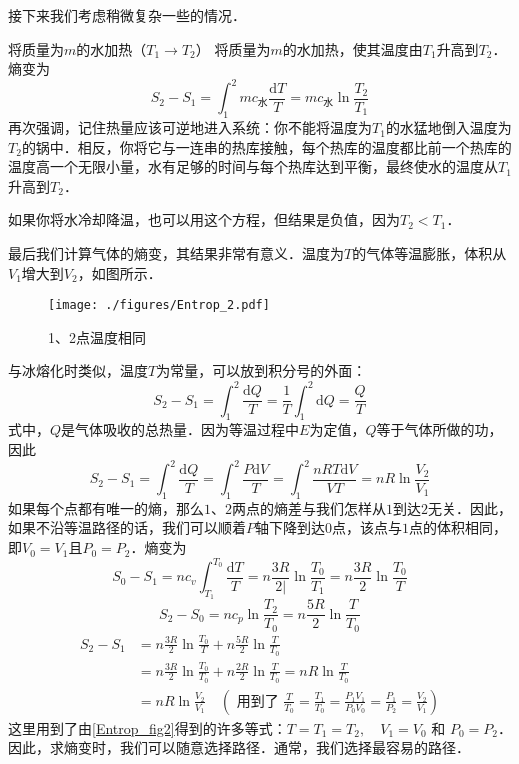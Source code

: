 接下来我们考虑稍微复杂一些的情况．

\begin{example}{将质量为$m $的水加热（$T_1\to T_2$）}
将质量为$m$的水加热，使其温度由$T_1$升高到$T_2$．熵变为
\begin{equation}
S_2-S_1=\int_1^2{mc_{\text{水}}\frac{\text{d}T}{T}}=mc_{\text{水}}\ln \frac{T_2}{T_1}
\end{equation}
再次强调，记住热量应该可逆地进入系统：你不能将温度为$T_1$的水猛地倒入温度为$T_2$的锅中．相反，你将它与一连串的热库接触，每个热库的温度都比前一个热库的温度高一个无限小量，水有足够的时间与每个热库达到平衡，最终使水的温度从$T_1$升高到$T_2$．

如果你将水冷却降温，也可以用这个方程，但结果是负值，因为$T_2<T_1$．

最后我们计算气体的熵变，其结果非常有意义．温度为$T $的气体等温膨胀，体积从$V_1$增大到$V_2$，如图所示．
\begin{figure}[ht]
\centering
\texttt{[image: ./figures/Entrop\_2.pdf]}
\caption{1、2点温度相同} \label{Entrop_fig2}
\end{figure}
\end{example}
与冰熔化时类似，温度$T $为常量，可以放到积分号的外面：
\begin{equation}
S_2-S_1=\int_1^2{\frac{\text{d}Q}{T}}=\frac{1}{T}\int_1^2{\text{d}Q=\frac{Q}{T}}
\end{equation}
式中，$ Q $是气体吸收的总热量．因为等温过程中$E$为定值，$Q$等于气体所做的功，因此
\begin{equation}
S_2-S_1=\int_1^2{\frac{\text{d}Q}{T}}=\int_1^2{\frac{P\text{d}V}{T}}=\int_1^2{\frac{nRT\text{d}V}{VT}=nR\ln \frac{V_2}{V_1}}
\end{equation}
如果每个点都有唯一的熵，那么$1$、$2$两点的熵差与我们怎样从$1$到达$2 $无关．因此，如果不沿等温路径的话，我们可以顺着$P $轴下降到达$0 $点，该点与$1 $点的体积相同，即$V_0=V_1$且$P_0=P_2$．熵变为
\begin{equation}
S_{0}-S_{1}=n c_{v} \int_{T_{1}}^{T_{0}} \frac{\mathrm{d} T}{T}=n \frac{3 R}{2 |} \ln \frac{T_{0}}{T_{1}}=n \frac{3 R}{2} \ln \frac{T_{0}}{T}
\end{equation}
\begin{equation}
S_{2}-S_{0}=n c_{p} \ln \frac{T_{2}}{T_{0}}=n \frac{5 R}{2} \ln \frac{T}{T_{0}}
\end{equation}
\begin{equation}
\begin{aligned} S_{2}-S_{1} &=n \frac{3 R}{2} \ln \frac{T_{0}}{T}+n \frac{5 R}{2} \ln \frac{T}{T_{0}} \\ &=n \frac{3 R}{2} \ln \frac{T_{0}}{T_{0}}+n \frac{2 R}{2} \ln \frac{T}{T_{0}}=n R \ln \frac{T}{T_{0}} \\ &=n R \ln \frac{V_{2}}{V_{1}} \quad\left(\text { 用到了 } \frac{T}{T_{0}}=\frac{T_{1}}{T_{0}}=\frac{P_{1} V_{1}}{P_{0} V_{0}}=\frac{P_{1}}{P_{2}}=\frac{V_{2}}{V_{1}}\right) \end{aligned}
\end{equation}
这里用到了由\autoref{Entrop_fig2}得到的许多等式：$T=T_{1}=T_{2}, \quad V_{1}=V_{0} \text { 和 } P_{0}=P_{2}$．因此，求熵变时，我们可以随意选择路径．通常，我们选择最容易的路径．
